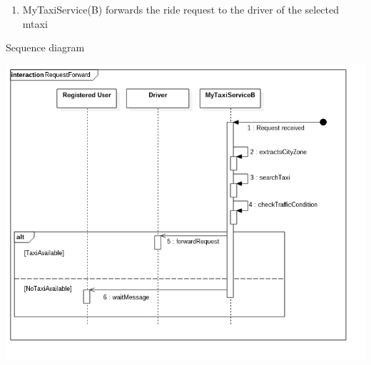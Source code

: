 \documentclass[11pt]{article} %
\begin{document}
\begin{enumerate}
\begin{description}
\begin{enumerate}
			          \item MyTaxiService(B) forwards the ride request to the driver of the selected mtaxi
			\end{enumerate}
		\end{description}
		\newpage
		Sequence diagram
		\begin{center}
		\includegraphics[scale=0.52]{usecase3.png}
		\end{center}


\end{enumerate}
\end{document}
